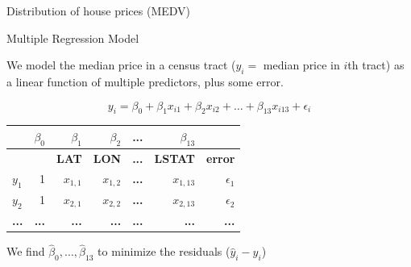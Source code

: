 \documentclass{beamer}\usepackage[]{graphicx}\usepackage[]{color}
\newenvironment{knitrout}{}{} %
\begin{document}
\begin{darkframes}
\begin{frame}[fragile]{Distribution of house prices (MEDV)}
\begin{knitrout}
\end{knitrout}
    \end{frame}
    
    
        \begin{frame}{Multiple Regression Model}
      
      We model the median price in a census tract ($y_i=$ median price in $i$th tract) as a linear function of multiple predictors, plus some error.
      
      \[
        y_i = \beta_0 + \beta_1 x_{i1} + \beta_2 x_{i2} +\ldots + \beta_{13} x_{i13} + \epsilon_i
      \]
      
    \begin{table}[!b]
        {\carlitoTLF %
        \begin{tabularx}{\textwidth}{Xrrrrrr}
           
           & $\beta_0$ & $\beta_1$ & $\beta_2$ & \textbf{...} &   $\beta_{13}$ & \\
          \toprule

          & & \textbf{LAT} & \textbf{LON} & \textbf{...} &   \textbf{LSTAT} & \textbf{error}\\
          \toprule
    $y_1$ & 1 & $x_{1,1}$ & $x_{1,2}$  & \textbf{...} & $x_{1,13}$ & $\epsilon_1$  \\
    $y_2$ & 1 & $x_{2,1}$ & $x_{2,2}$  & \textbf{...} & $x_{2,13}$ & $\epsilon_2$\\
    \textbf{...}  & \textbf{...} &  \textbf{...} & \textbf{...}  & \textbf{...} &   \textbf{...}  & \textbf{...}\\
      
          \bottomrule
        \end{tabularx}}
        
      \end{table}     
     
      \bigskip\pause
      
      We find $\hat\beta_0,\ldots,\hat\beta_{13}$ to minimize the residuals ($\hat y_i - y_i$)
      
    \end{frame}
    

\end{darkframes}
\end{document}
